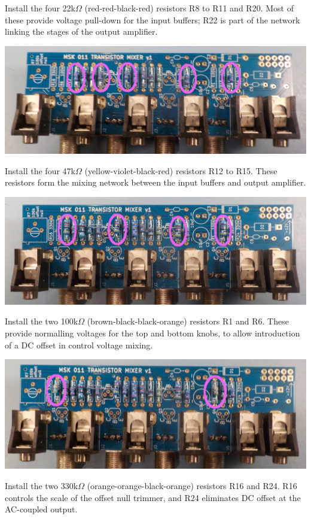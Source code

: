 Install the four 22k$\Omega$ (red-red-black-red) resistors R8 to R11 and
R20.  Most of these provide voltage pull-down for the input buffers; R22 is
part of the network linking the stages of the output amplifier.

\nopagebreak
\noindent\includegraphics[width=\linewidth]{res-22k.jpg}

Install the four 47k$\Omega$ (yellow-violet-black-red) resistors R12 to R15. 
These resistors form the mixing network between the input buffers and output
amplifier.

\nopagebreak
\noindent\includegraphics[width=\linewidth]{res-47k.jpg}

Install the two 100k$\Omega$ (brown-black-black-orange) resistors R1 and R6. 
These provide normalling voltages for the top and bottom knobs, to allow
introduction of a DC offset in control voltage mixing.

\nopagebreak
\noindent\includegraphics[width=\linewidth]{res-100k.jpg}

\pagebreak

Install the two 330k$\Omega$ (orange-orange-black-orange) resistors R16 and
R24.  R16 controls the scale of the offset null trimmer, and R24 eliminates
DC offset at the AC-coupled output.

